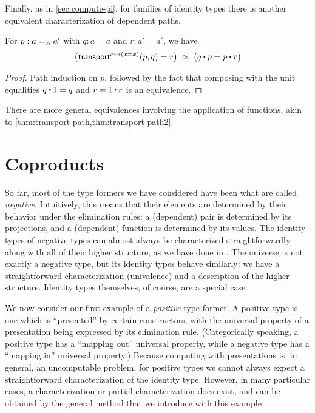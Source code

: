 Finally, as in \autoref{sec:compute-pi}, for families of identity types there is another equivalent characterization of dependent paths.

\begin{thm}\label{thm:dpath-path}
  For $p:\id[A]a{a'}$ with $q:a=a$ and $r:a'=a'$, we have
  \[ \eqvspaced{ \big(\transfib{x\mapsto (x=x)}{p}{q} = r \big) }{ \big( q \ct p = p \ct r \big) } \]
\end{thm}
\begin{proof}
  Path induction on $p$, followed by the fact that composing with the unit equalities $q\ct 1 = q$ and $r = 1\ct r$ is an equivalence.
\end{proof}

There are more general equivalences involving the application of functions, akin to \autoref{thm:transport-path,thm:transport-path2}.

%

\section{Coproducts}
\label{sec:compute-coprod}

%
So far, most of the type formers we have considered have been what are called \emph{negative}.
Intuitively, this means that their elements are determined by their behavior under the elimination rules: a (dependent) pair is determined by its projections, and a (dependent) function is determined by its values.
The identity types of negative types can almost always be characterized straightforwardly, along with all of their higher structure, as we have done in .
The universe is not exactly a negative type, but its identity types behave similarly: we have a straightforward characterization (univalence) and a description of the higher structure.
Identity types themselves, of course, are a special case.

We now consider our first example of a \emph{positive} type former.
A positive type is one which is ``presented'' by certain constructors, with the universal property of a presentation being expressed by its elimination rule.
(Categorically speaking, a positive type has a ``mapping out'' universal property, while a negative type has a ``mapping in'' universal property.)
Because computing with presentations is, in general, an uncomputable problem, for positive types we cannot always expect a straightforward characterization of the identity type.
However, in many particular cases, a characterization or partial characterization does exist, and can be obtained by the general method that we introduce with this example.


